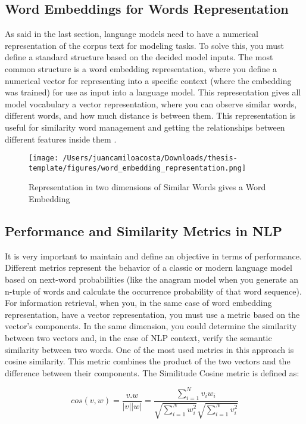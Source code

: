 \subsection{Word Embeddings for Words Representation}
As said in the last section, language models need to have a numerical representation of the corpus text for modeling tasks. To solve this, you must define a standard structure based on the decided model inputs. The most common structure is a word embedding representation, where you define a numerical vector for representing into a specific context (where the embedding was trained) for use as input into a language model. This representation gives all model vocabulary a vector representation, where you can observe similar words, different words, and how much distance is between them. This representation is useful for similarity word management and getting the relationships between different features inside them \citet{nlp-fundamentals}. 

    \begin{figure}[H]
    \centering
    \texttt{[image: /Users/juancamiloacosta/Downloads/thesis-template/figures/word\_embedding\_representation.png]}
    \caption{Representation in two dimensions of Similar Words gives a Word Embedding \citet{nlp-fundamentals} }
    \label{fig:word-embedding}
    \end{figure}

\subsection{Performance and Similarity Metrics in NLP}
It is very important to maintain and define an objective in terms of performance. Different metrics represent the behavior of a classic or modern language model based on next-word probabilities (like the anagram model when you generate an n-tuple of words and calculate the occurrence probability of that word sequence). For information retrieval, when you, in the same case of word embedding representation, have a vector representation, you must use a metric based on the vector's components. In the same dimension, you could determine the similarity between two vectors and, in the case of NLP context, verify the semantic similarity between two words. One of the most used metrics in this approach is cosine similarity. This metric combines the product of the two vectors and the difference between their components. The Similitude Cosine metric is defined as:

\begin{equation}
cos(v,w) = \frac{v.w}{|v||w|} = \frac{\sum_{i=1}^{N} v_{i}w_{i}}{\sqrt{\sum_{i=1}^{N} w_{i}^{2}} \sqrt{\sum_{i=1}^{N} v_{i}^{2}}}
\end{equation}

